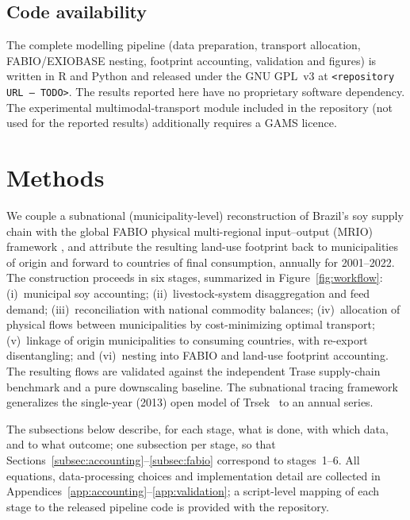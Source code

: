 \documentclass[pdflatex,sn-nature]{sn-jnl}%
\begin{document}
\subsection{Code availability}\label{subsec:code-availability}
The complete modelling pipeline (data preparation, transport allocation,
FABIO/EXIOBASE nesting, footprint accounting, validation and figures) is
written in R and Python and released under the GNU GPL~v3 at
\texttt{<repository URL --- TODO>}. The results reported here have no
proprietary software dependency. The experimental multimodal-transport
module included in the repository (not used for the reported results)
additionally requires a GAMS licence.


\clearpage %

\section{Methods}\label{sec:methods}

We couple a subnational (municipality-level) reconstruction of Brazil's soy
supply chain with the global FABIO physical multi-regional input--output
(MRIO) framework \cite{bruckner2019fabio}, and attribute the resulting
land-use footprint back to municipalities of origin and forward to countries
of final consumption, annually for 2001--2022. The construction proceeds in
six stages, summarized in Figure~\ref{fig:workflow}: (i)~municipal soy
accounting; (ii)~livestock-system disaggregation and feed demand;
(iii)~reconciliation with national commodity balances; (iv)~allocation of
physical flows between municipalities by cost-minimizing optimal transport;
(v)~linkage of origin municipalities to consuming countries, with re-export
disentangling; and (vi)~nesting into FABIO and land-use footprint
accounting. The resulting flows are validated against the independent Trase
supply-chain benchmark and a pure downscaling baseline. The subnational
tracing framework generalizes the single-year (2013) open model of
Trsek~\cite{trsek2022} to an annual series.

The subsections below describe, for each stage, what is done, with which
data, and to what outcome; one subsection per stage, so that
Sections~\ref{subsec:accounting}--\ref{subsec:fabio} correspond to
stages~1--6. All equations, data-processing choices and
implementation detail are collected in
Appendices~\ref{app:accounting}--\ref{app:validation}; a script-level
mapping of each stage to the released pipeline code is provided with the
repository.
\end{document}
